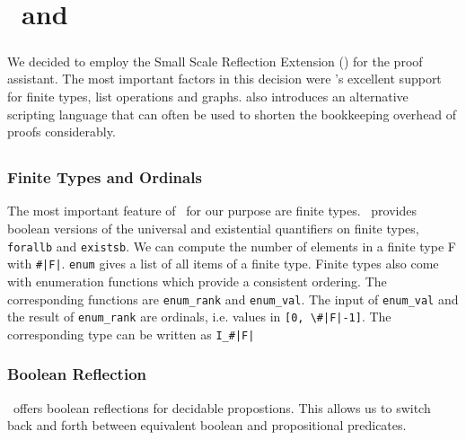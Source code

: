 \chapter{\coq\ and \ssreflect}

\paragraph{}
We decided to employ the Small Scale Reflection Extension (\textbf{\ssreflect}) for the \textbf{\coq} proof assistant. 
The most important factors in this decision were \ssreflect's excellent support for finite types, list operations and graphs. \ssreflect{} also introduces an alternative scripting language that can often be used to shorten the bookkeeping overhead of proofs considerably.

\section{\coq}

\section{\ssreflect}

\subsection{Finite Types and Ordinals}
The most important feature of \ssreflect\ for our purpose are finite types. 
\ssreflect\ provides boolean versions of the universal and existential quantifiers on finite types, \lstinline{forallb} and \lstinline{existsb}.
We can compute the number of elements in a finite type F with \lstinline{#|F|}.
\lstinline{enum} gives a list of all items of a finite type. 
Finite types also come with enumeration functions which provide a consistent ordering. 
The corresponding functions are \lstinline{enum_rank} and \lstinline{enum_val}. 
The input of \lstinline{enum_val} and the result of \lstinline{enum_rank} are ordinals, i.e. values in \lstinline{[0, \#|F|-1]}. 
The corresponding type can be written as \lstinline{I_#|F|}

\subsection{Boolean Reflection}
\ssreflect\ offers boolean reflections for decidable propostions. 
This allows us to switch back and forth between equivalent boolean and propositional predicates.


